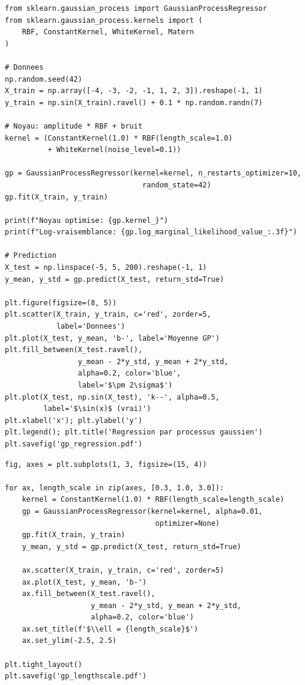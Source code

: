 \begin{codeblock}[title=\textbf{R\'egression par processus gaussien avec scikit-learn}]
\begin{verbatim}
from sklearn.gaussian_process import GaussianProcessRegressor
from sklearn.gaussian_process.kernels import (
    RBF, ConstantKernel, WhiteKernel, Matern
)

# Donnees
np.random.seed(42)
X_train = np.array([-4, -3, -2, -1, 1, 2, 3]).reshape(-1, 1)
y_train = np.sin(X_train).ravel() + 0.1 * np.random.randn(7)

# Noyau: amplitude * RBF + bruit
kernel = (ConstantKernel(1.0) * RBF(length_scale=1.0)
          + WhiteKernel(noise_level=0.1))

gp = GaussianProcessRegressor(kernel=kernel, n_restarts_optimizer=10,
                                random_state=42)
gp.fit(X_train, y_train)

print(f"Noyau optimise: {gp.kernel_}")
print(f"Log-vraisemblance: {gp.log_marginal_likelihood_value_:.3f}")

# Prediction
X_test = np.linspace(-5, 5, 200).reshape(-1, 1)
y_mean, y_std = gp.predict(X_test, return_std=True)

plt.figure(figsize=(8, 5))
plt.scatter(X_train, y_train, c='red', zorder=5,
            label='Donnees')
plt.plot(X_test, y_mean, 'b-', label='Moyenne GP')
plt.fill_between(X_test.ravel(),
                 y_mean - 2*y_std, y_mean + 2*y_std,
                 alpha=0.2, color='blue',
                 label='$\pm 2\sigma$')
plt.plot(X_test, np.sin(X_test), 'k--', alpha=0.5,
         label='$\sin(x)$ (vrai)')
plt.xlabel('x'); plt.ylabel('y')
plt.legend(); plt.title('Regression par processus gaussien')
plt.savefig('gp_regression.pdf')
\end{verbatim}
\end{codeblock}

\begin{codeblock}[title=\textbf{Effet de la longueur caract\'eristique}]
\begin{verbatim}
fig, axes = plt.subplots(1, 3, figsize=(15, 4))

for ax, length_scale in zip(axes, [0.3, 1.0, 3.0]):
    kernel = ConstantKernel(1.0) * RBF(length_scale=length_scale)
    gp = GaussianProcessRegressor(kernel=kernel, alpha=0.01,
                                   optimizer=None)
    gp.fit(X_train, y_train)
    y_mean, y_std = gp.predict(X_test, return_std=True)

    ax.scatter(X_train, y_train, c='red', zorder=5)
    ax.plot(X_test, y_mean, 'b-')
    ax.fill_between(X_test.ravel(),
                    y_mean - 2*y_std, y_mean + 2*y_std,
                    alpha=0.2, color='blue')
    ax.set_title(f'$\\ell = {length_scale}$')
    ax.set_ylim(-2.5, 2.5)

plt.tight_layout()
plt.savefig('gp_lengthscale.pdf')
\end{verbatim}
\end{codeblock}

